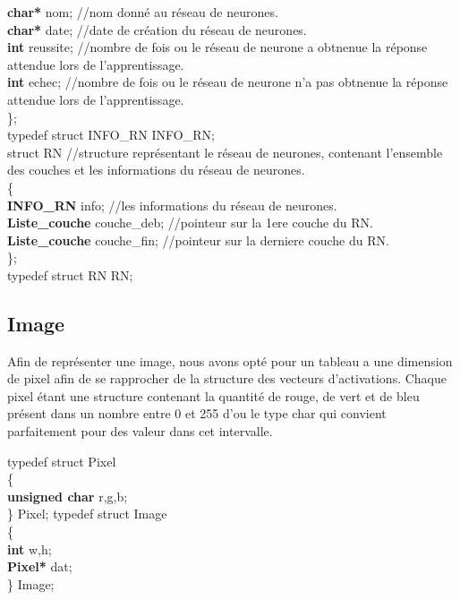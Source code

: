 \documentclass{article}
\newcommand\tab[1][1cm]{\hspace*{#1}}
\begin{document}
\begin{flushleft}
			\tab \textcolor{myblue}{\textbf{char*}} nom;	//nom donné au réseau de neurones.\\
			\tab \textcolor{myblue}{\textbf{char*}} date;	//date de création du réseau de neurones.\\
			\tab \textcolor{myblue}{\textbf{int}} reussite;	//nombre de fois ou le réseau de neurone a obtnenue la réponse attendue lors de l'apprentissage.\\
			\tab \textcolor{myblue}{\textbf{int}} echec;	//nombre de fois ou le réseau de neurone n'a pas obtnenue la réponse attendue lors de l'apprentissage.\\
		\};\\
		\bigbreak
		typedef struct INFO\_RN INFO\_RN;\\
		\bigbreak
		struct RN	//structure représentant le réseau de neurones, contenant l'ensemble des couches et les informations du réseau de neurones.\\
		\{\\
			\tab \textcolor{myblue}{\textbf{INFO\_RN}} info;	//les informations du réseau de neurones.\\
			\tab \textcolor{myblue}{\textbf{Liste\_couche}} couche\_deb;	//pointeur sur la 1ere couche du RN.\\
			\tab \textcolor{myblue}{\textbf{Liste\_couche}} couche\_fin;    //pointeur sur la derniere couche du RN.\\
		\};\\
		\bigbreak
		typedef struct RN RN;
		
	\end{flushleft}
	
	\subsection{Image}
	Afin de représenter une image, nous avons opté pour un tableau a une dimension de pixel afin de se rapprocher de la structure des vecteurs d'activations. Chaque pixel étant une structure contenant la quantité de rouge, de vert et de bleu présent dans un nombre entre 0 et 255 d'ou le type char qui convient parfaitement pour des valeur dans cet intervalle.
	\begin{flushleft}
		typedef struct Pixel\\
			\{\\
				\tab \textcolor{myblue}{\textbf{unsigned char}} r,g,b;\\
			\} Pixel;
		\bigbreak
		typedef struct Image\\
			\{\\
				\tab \textcolor{myblue}{\textbf{int}} w,h;\\
				\tab \textcolor{myblue}{\textbf{Pixel*}} dat;\\
			\} Image;
	\end{flushleft}
	
\end{document}
